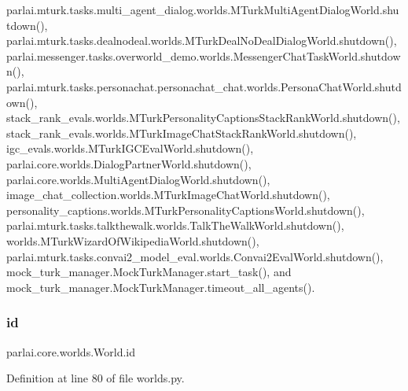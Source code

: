 parlai.\+mturk.\+tasks.\+multi\+\_\+agent\+\_\+dialog.\+worlds.\+M\+Turk\+Multi\+Agent\+Dialog\+World.\+shutdown(), parlai.\+mturk.\+tasks.\+dealnodeal.\+worlds.\+M\+Turk\+Deal\+No\+Deal\+Dialog\+World.\+shutdown(), parlai.\+messenger.\+tasks.\+overworld\+\_\+demo.\+worlds.\+Messenger\+Chat\+Task\+World.\+shutdown(), parlai.\+mturk.\+tasks.\+personachat.\+personachat\+\_\+chat.\+worlds.\+Persona\+Chat\+World.\+shutdown(), stack\+\_\+rank\+\_\+evals.\+worlds.\+M\+Turk\+Personality\+Captions\+Stack\+Rank\+World.\+shutdown(), stack\+\_\+rank\+\_\+evals.\+worlds.\+M\+Turk\+Image\+Chat\+Stack\+Rank\+World.\+shutdown(), igc\+\_\+evals.\+worlds.\+M\+Turk\+I\+G\+C\+Eval\+World.\+shutdown(), parlai.\+core.\+worlds.\+Dialog\+Partner\+World.\+shutdown(), parlai.\+core.\+worlds.\+Multi\+Agent\+Dialog\+World.\+shutdown(), image\+\_\+chat\+\_\+collection.\+worlds.\+M\+Turk\+Image\+Chat\+World.\+shutdown(), personality\+\_\+captions.\+worlds.\+M\+Turk\+Personality\+Captions\+World.\+shutdown(), parlai.\+mturk.\+tasks.\+talkthewalk.\+worlds.\+Talk\+The\+Walk\+World.\+shutdown(), worlds.\+M\+Turk\+Wizard\+Of\+Wikipedia\+World.\+shutdown(), parlai.\+mturk.\+tasks.\+convai2\+\_\+model\+\_\+eval.\+worlds.\+Convai2\+Eval\+World.\+shutdown(), mock\+\_\+turk\+\_\+manager.\+Mock\+Turk\+Manager.\+start\+\_\+task(), and mock\+\_\+turk\+\_\+manager.\+Mock\+Turk\+Manager.\+timeout\+\_\+all\+\_\+agents().

\mbox{\label{classparlai_1_1core_1_1worlds_1_1World_a568184e1c2ccaff10d9a0b69ecb8115a}} 
\subsubsection{\texorpdfstring{id}{id}}
{\footnotesize\ttfamily parlai.\+core.\+worlds.\+World.\+id}



Definition at line 80 of file worlds.\+py.



